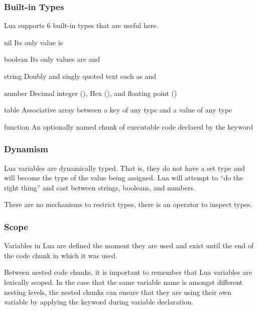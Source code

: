 \subsubsection{Built-in Types}

Lua supports 6 built-in types that are useful here.

\begin{Definition}

\item[nil] Its only value is 

\item[boolean] Its only values are  and 

\item[string] Doubly and singly quoted text such as  and

\item[number] Decimal integer (), Hex (), and
floating point ()

\item[table] Associative array between a key of any type and a value of any
type

\item[function] An optionally named chunk of executable code declared by the
 keyword

\end{Definition}

\subsubsection{Dynamism}

Lua variables are dynamically typed.  That is, they do not have a set type and
will become the type of the value being assigned.  Lua will attempt to ``do the
right thing'' and cast between strings, booleans, and numbers.

There are no mechanisms to restrict types, there is an operator to inspect
types.

\subsubsection{Scope}

Variables in Lua are defined the moment they are used and exist until the end
of the code chunk in which it was used.

Between nested code chunks, it is important to remember that Lua variables are
lexically scoped.  In the case that the same variable name is amongst different
nesting levels, the nested chunks can ensure that they are using their own
variable by applying the  keyword during variable declaration.

